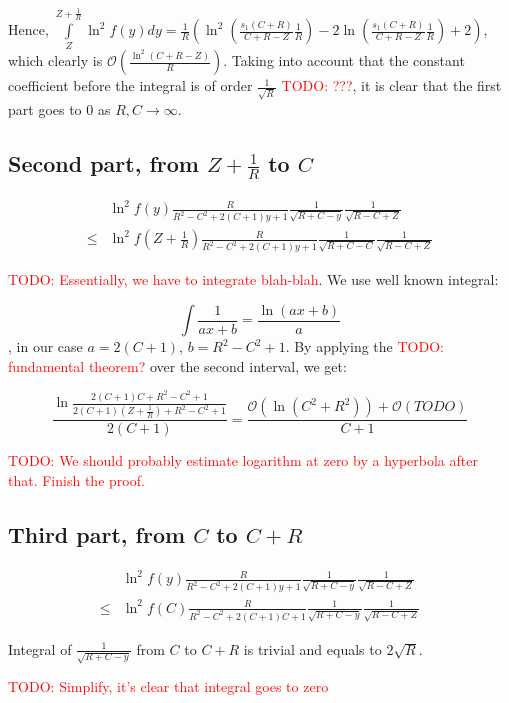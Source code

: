 \documentclass[12pt, a4paper]{article}
\newcommand{\mcO}{\mathcal{O}}
\newcommand{\todo}[1]{{\large \textcolor{red}{TODO: #1}}}
\begin{document}
Hence, $\int\limits_{Z}^{Z + \frac{1}{R}} \ln^2 f(y) dy = \frac{1}{R} ( \ln^2 (\frac{s_1(C + R)}{C + R - Z} \frac{1}{R}) - 2 \ln (\frac{s_1(C + R)}{C + R - Z} \frac{1}{R}) + 2)$, which clearly is $\mcO(\frac{\ln^2(C + R - Z)}{R})$. Taking into account that the constant coefficient before the integral is of order $\frac{1}{\sqrt{R}}$ \todo{???}, it is clear that the first part goes to $0$ as $R, C \to \infty$.


\subsection*{Second part, from $Z + \frac{1}{R}$ to $C$}

\begin{align*}
       & \ln^2 f(y) \frac{R}{R^2 - C^2 + 2 (C + 1) y + 1} \frac{1}{\sqrt{R + C - y}} \frac{1}{\sqrt{R - C + Z}}
\\ \le & \ln^2 f(Z + \frac{1}{R}) \frac{R}{R^2 - C^2 + 2 (C + 1) y + 1} \frac{1}{\sqrt{R + C - C}} \frac{1}{\sqrt{R - C + Z}}
\end{align*}

\todo{Essentially, we have to integrate blah-blah}. We use well known integral:

\[
\int \frac{1}{a x + b} = \frac{\ln (a x + b)}{a}
\]
, in our case $a = 2 (C + 1)$, $b = R^2 - C^2 + 1$. By applying the \todo{fundamental theorem?} over the second interval, we get:

\[
\frac{\ln \frac{2 (C + 1) C + R^2 - C^2 + 1}{2 (C + 1) (Z + \frac{1}{R}) + R^2 - C^2 + 1}}{2 (C + 1)} = \frac{\mcO(\ln(C^2 + R^2)) + \mcO(TODO)}{C + 1}
\]

\todo{We should probably estimate logarithm at zero by a hyperbola after that. Finish the proof.}

\subsection*{Third part, from $C$ to $C + R$}

\begin{align*}
       & \ln^2 f(y) \frac{R}{R^2 - C^2 + 2 (C + 1) y + 1} \frac{1}{\sqrt{R + C - y}} \frac{1}{\sqrt{R - C + Z}}
\\ \le & \ln^2 f(C) \frac{R}{R^2 - C^2 + 2 (C + 1) C + 1} \frac{1}{\sqrt{R + C - y}} \frac{1}{\sqrt{R - C + Z}}
\end{align*}

Integral of $\frac{1}{\sqrt{R + C - y}}$ from $C$ to $C + R$ is trivial and equals to $2 \sqrt{R}$.

\todo{Simplify, it's clear that integral goes to zero}
\end{document}
